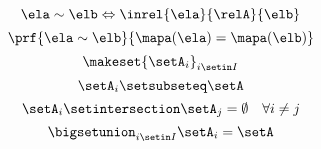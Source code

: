 \begin{forslides}
    \begin{equation}\label{eq:slides_session2_158}
        \ela\sim \elb \Leftrightarrow \inrel{\ela}{\relA}{\elb}
    \end{equation}
    \begin{equation}\label{eq:slides_session2_159}
        \prf{
            \ela\sim \elb
        }{
            \mapa(\ela)=\mapa(\elb)
        }
    \end{equation}
    \begin{equation}\label{eq:slides_session2_160}
        \makeset{\setA_i}_{i\setin I}
    \end{equation}
    \begin{equation}\label{eq:slides_session2_161}
        \setA_i\setsubseteq \setA
    \end{equation}
    \begin{equation}\label{eq:slides_session2_162}
        \setA_i\setintersection \setA_j=\emptyset \quad \forall i\neq j
    \end{equation}
    \begin{equation}\label{eq:slides_session2_163}
        \bigsetunion_{i\setin I}\setA_i=\setA
    \end{equation}


\end{forslides}
